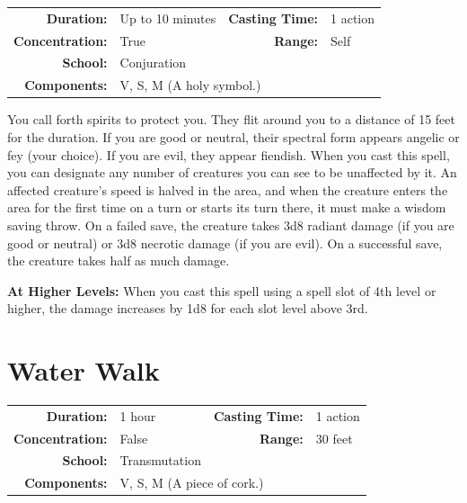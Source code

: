 \documentclass[12pt,showtrims]{memoir}
\begin{document}
{
\small\centering\vspace{-6pt}
\begin{tabular}{rlrl}
\toprule

\textbf{Duration:} & Up to 10 minutes &
\textbf{Casting Time:} & 1 action \\
\textbf{Concentration:} & True &
\textbf{Range:} & Self \\
\textbf{School:} & Conjuration \\
\textbf{Components:} & \multicolumn{3}{p{0.7\textwidth}}{V, S, M (A holy symbol.)}\\

\bottomrule
\end{tabular}
}

\vspace{1\baselineskip}\noindent You call forth spirits to protect you. They flit around you to a distance of 15 feet for the duration. If you are good or neutral, their spectral form appears angelic or fey (your choice). If you are evil, they appear fiendish. When you cast this spell, you can designate any number of creatures you can see to be unaffected by it. An affected creature's speed is halved in the area, and when the creature enters the area for the first time on a turn or starts its turn there, it must make a wisdom saving throw. On a failed save, the creature takes 3d8 radiant damage (if you are good or neutral) or 3d8 necrotic damage (if you are evil). On a successful save, the creature takes half as much damage.

\vspace{8pt} \noindent\textbf{At Higher Levels:} When you cast this spell using a spell slot of 4th level or higher, the damage increases by 1d8 for each slot level above 3rd.
\newpage
\section*{Water Walk}

{
\small\centering\vspace{-6pt}
\begin{tabular}{rlrl}
\toprule

\textbf{Duration:} & 1 hour &
\textbf{Casting Time:} & 1 action \\
\textbf{Concentration:} & False &
\textbf{Range:} & 30 feet \\
\textbf{School:} & Transmutation \\
\textbf{Components:} & \multicolumn{3}{p{0.7\textwidth}}{V, S, M (A piece of cork.)}\\

\bottomrule
\end{tabular}
}
\end{document}
